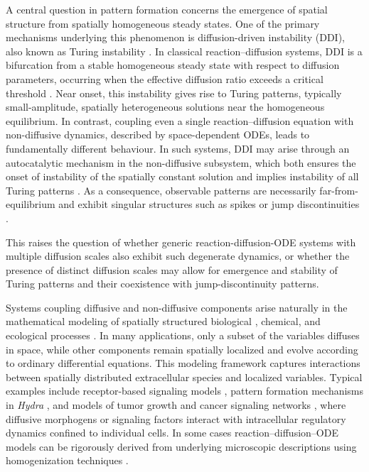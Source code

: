 \documentclass[12pt, a4paper]{amsart}
\numberwithin{equation}{section}
\begin{document}



A central question in pattern formation concerns the emergence of spatial structure from spatially homogeneous steady states. One of the primary mechanisms underlying this phenomenon is diffusion-driven instability (DDI), also known as Turing instability \cite{turing1952chemical}. In classical reaction–diffusion systems, DDI is a bifurcation from a stable homogeneous steady state with respect to diffusion parameters, occurring when the effective diffusion ratio exceeds a critical threshold \cite{Nishiura1982}. Near onset, this instability gives rise to Turing patterns, typically small-amplitude, spatially heterogeneous solutions near the homogeneous equilibrium. In contrast, coupling even a single reaction–diffusion equation with non-diffusive dynamics, described by space-dependent ODEs, leads to fundamentally different behaviour. In such systems,  DDI may arise through an autocatalytic mechanism in the non-diffusive subsystem, which both ensures the onset of instability of the spatially constant solution and implies instability of all Turing patterns \cite{Marciniak15,Cygan2022}. As a consequence, observable patterns are necessarily far-from-equilibrium and exhibit singular structures such as spikes \cite{HMC14} or jump discontinuities \cite{Haerting17}.

This raises the question of whether generic reaction-diffusion-ODE systems with multiple diffusion scales also exhibit such degenerate dynamics, or whether the presence of distinct diffusion scales may allow for emergence and stability of Turing patterns and their coexistence with jump-discontinuity patterns.

Systems coupling diffusive and non-diffusive components arise naturally in the mathematical modeling of spatially structured biological \cite{Klika12, Takagi21_2, He19}, chemical, and ecological processes \cite{Iuorio2023, marasco2014vegetation}. 
In many applications, only a subset of the variables diffuses in space, while other components remain spatially localized and evolve according to ordinary differential equations. 
This modeling framework captures interactions between spatially distributed extracellular species and localized variables. 
Typical examples include receptor-based signaling models \cite{Zhang2025}, pattern formation mechanisms in \emph{Hydra} \cite{Marciniak06}, and models of tumor growth and cancer signaling networks \cite{GALLAY2022103387}, where diffusive morphogens or signaling factors interact with intracellular regulatory dynamics confined to individual cells. In some cases reaction--diffusion--ODE models can be  rigorously derived from underlying microscopic descriptions using homogenization techniques \cite{marciniakptashnyk2008, marciniak2012stronghomog}.
\end{document}
